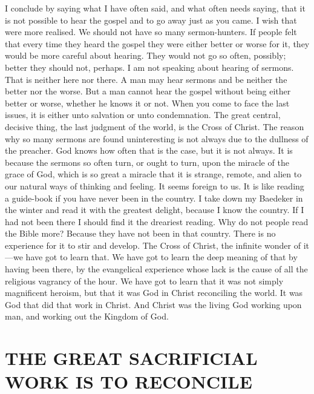 \documentclass[12pt,letterpaper,oneside]{book}
\begin{document}
I conclude by saying what I have often said, 
and what often needs saying, that it is not 
possible to hear the gospel and to go away just 
as you came. I wish that were more realised. 
We should not have so many sermon-hunters. 
If people felt that every time they heard the 
gospel they were either better or worse for it, 
they would be more careful about hearing. 
They would not go so often, possibly; better they 
should not, perhaps. I am not speaking about 
hearing of sermons. That is neither here nor 
there. A man may hear sermons and be neither 
the better nor the worse. But a man cannot 
hear the gospel without being either better or 
worse, whether he knows it or not. When you 
come to face the last issues, it is either unto 
salvation or unto condemnation. The great 
central, decisive thing, the last judgment of the 
world, is the Cross of Christ. The reason why 
so many sermons are found uninteresting is not 
always due to the dullness of the preacher. God 
knows how often that is the case, but it is not 
always. It is because the sermons so often turn, 
or ought to turn, upon the miracle of the grace 
of God, which is so great a miracle that it is 
strange, remote, and alien to our natural ways 
of thinking and feeling. It seems foreign to us. 
It is like reading a guide-book if you have never 
been in the country. I take down my Baedeker 
in the winter and read it with the greatest 
delight, because I know the country. If I had 
not been there I should find it the dreariest reading. 
Why do not people read the Bible more? 
Because they have not been in that country. 
There is no experience for it to stir and develop. 
The Cross of Christ, the infinite wonder of it---we 
have got to learn that. We have got to 
learn the deep meaning of that by having been 
there, by the evangelical experience whose lack 
is the cause of all the religious vagrancy of the 
hour. We have got to learn that it was not 
simply magnificent heroism, but that it was God 
in Christ reconciling the world. It was God 
that did that work in Christ. And Christ was 
the living God working upon man, and working 
out the Kingdom of God. 


\chapter{THE GREAT SACRIFICIAL WORK 
IS TO RECONCILE} 

\end{document}
